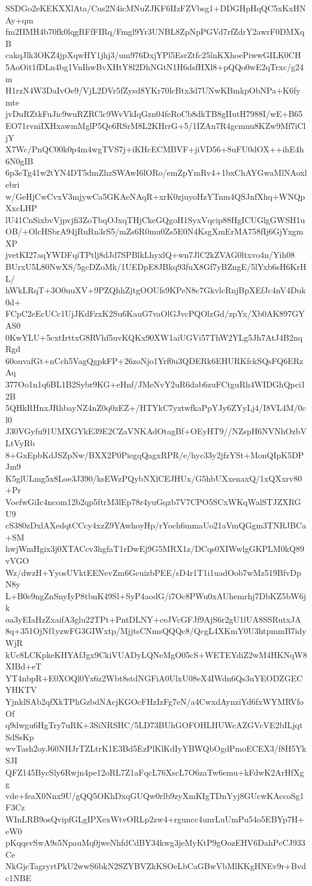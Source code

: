SSDGo2eKEKXXlAta/Cus2N4icMNuZJKF6IIzFZVbsg1+DDGHpHqQC5xKxHNAy+qm
fm2IIMH4b70fk0lqgRFfFIRq/Fmgl9Yr3UNBL8ZpNpPGVd7rfZdrY2awrF0DMXqB
cakqJlk3OKZ4jpXqwHY1jhj3/um976DxjYPl5EsrZtfc25lnKXhoePiwwGILK0CH
5AoOit1fDLn4bg1VnIhwBvXHtY8l2DhNGtN1H6dsfHXl8+pQQo0wE2qTrxc/g24m
H1rzN4W3DaIvOe9/VjL2DVr5fZysd8YKr70lcBtx3d7UNwKBmkpObNPa+K6fymte
jvDuRZtkFuJic9wuRZRClc9WvVkIqGzn04feRoCb8dkTB8gIIutH7988I/wE+B65
EO71rvniIXHxawmMglP5Qe6RSrM8L2KHrrG+5/1IZAn7R4gcmnu8KZw9Mf7iCljY
X7Wc/PnQC00k0p4m4wgTVS7j+iKHcECMBVF+jiVD56+8uFU0dOX++ihE4h6N0gIB
6p3eTg41w2tYN4DT5dmZhzSWAwI6lORo/emZpYmRv4+1bxChAYGwaMlNAoxlebri
w/GeHjCwCvxV3mjywCa5GKAeNAqR+xrK0zjuyoHzYTnm4QSJnfXhq+WNQpXxcLHP
lU41CnSixbvVjpvjfi3ZoTbqOJxqTHjCkeGQgoH1SyxVqcip88HgICUGlgGWSH1u
OB/+OlcHSbrA94jRuRn3rS5/mZs6R0mu0Zs5E0N4KsgXmErMA758fIj6GjYxgmXP
jvetKI27aqYWDFqiTPtlj8dJd7SPBlkLhyxlQ+wn7JlC2kZVAG0ltxvo4n/Yih08
BUrxU5L80NwXS/5gcDZoMk/1UEDpE8JBkq93fuX8Gf7yBZngE/5lYxb6sH6KrHL/
hWkLRqT+3O0uuXV+9PZQhhZjtgOOUfs9KPeN8c7GkvlcRnjBpXEfJc4nV4Duk0d+
FCpC2eEcUCc1UjJKdFzxK2Su6KauG7vaOlGJvcPQOlzGd/zpYx/Xb0AK897GYAS0
0KwYLU+5cxtIrttxG8RVhf5uvKQKx90XW1aiUGVi57ThW2YLg5Jh7AtJ4B2nqRgd
60ouvafGt+nCch5VagQgpkFP+26zoNjo1Yrf0u3QDERk6EHURKfckSQsFQ6ERzAq
377Oo1n1q6BL1B2Sybr9KG+eHnf/JMeNvY2uR6dab6zuFCtguRh4WIDGhQpci12B
5QHkRHnxJRhbayNZ4nZ0q0zEZ+/HTYkC7yztwfkaPpYJy6ZYyLj4/I8VL4M/0cl0
J30VGyfu91UMXGYkE39E2CZaVNKAdOtagBf+OEyHT9//NZspH6NVNhOzbVLtVyRb
8+GxEpbKdJSZpNw/BXX2P0PiegqQagxRPR/e/hyc33y2jfzYSt+MonQIpK5DPJm9
K5glULmg5x8Loe3J390/ksEWzPQybNXlCEJHUx/G5hbUXxenaxQ/1xQXxrv80+Pr
VoefwGiIc4ncom12b2qp5ftrM3lEp78r4yuGqzb7V7CPO5SCxWKqWalSTJZXRGU9
cS380zDxlAXedqtCCcy4xzZ9YAwhoyHp/rYoch6mmaUo21aVmQGgm3TNRJBCa+SM
hwjWmHgix3j0XTACcv3hgfaT1rDwEj9G5MRX1z/DCqs0XIWwlgGKPLM0kQ89vVGO
Wz/dwzH+YyosUVktEENevZm6GcuizbPEE/sD4r1T1i1uadOob7wMz519BfvDpN8y
L+B0e9ngZnSnyIyP8tbnK49Sl+SyP4aodG/i7Oc8PWu0xAUhemrhj7DbKZ5bW6jk
oa3yEIaHzZxaifA3glu22TPt+PntDLNY+ceJVcGFJf9AjS6r2gU1lUA8SSRutxJA
8q+351OjNf1yzwFG3GIWxtp/MjjtsCNmsQQQc8/QcgL4XKmY0U3htpmmB7idyWjR
kUc8LCKpkeKHYAfJgx9CkiVUADyLQNeMgO05cS+WETEYdiZ2wM4HKNqW8XIBd+eT
YT4nbpR+E0XOQl0Yx6z2Wbt8stdNGFiA0UlxU08eX4IWdn6Qs3uYEODZGECYHKTV
YjnklSAb2qfXkTPhGzbdNAcjKGOcFHzIzFg7eN/a4CwxdAynziYd6fxWYMRVfoOf
q9dwgu6HgTry7uRK+3SiNRSHC/5LD73BUhGOFOHLHUWcAZGVcVE2bILjqtSdSsKp
wvTash2oyJ60NHJrTZLtrK1E3Bd5EzPlKlKdIyYBWQbOgdPmoECEX3/f8H5YkSJI
QFZ145BycSly6Rwjn4pe12oRL7Z1aFqcL76XscL7O6zaTw6emu+kFdwK2ArHfXgg
vde+feaX0Nnx9U/gQQ5OKhDxqGUQw0rlb9zyXmKIgTDnYyj8GUcwKAccoSg1F3Cz
WInLRB9osQvipfGLgIPXexWtvORLp2zw4+rguncc4unrLuUmPu54o5EBYp7H+eW0
pKqqsvSwA9s5NpauMq0jweNhfdCdBY34kwg3jeMyKtP9gOozEHV6DahPcCJ933Ce
NkGjcTagryrtPkU2wwS6bkN2SZYBVZkKSOeLbCaGBwVbMlKKgHNEv9r+Bvdc1NBE
